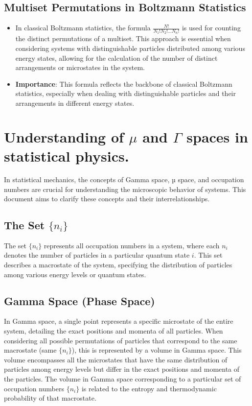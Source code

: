 \documentclass[12pt]{article}
\begin{document}
\subsection{Multiset Permutations in Boltzmann Statistics}
\begin{itemize}
    \item In classical Boltzmann statistics, the formula $\frac{N!}{N_1!N_2!\ldots N_n!}$ is used for counting the distinct permutations of a multiset. This approach is essential when considering systems with distinguishable particles distributed among various energy states, allowing for the calculation of the number of distinct arrangements or microstates in the system.
    \item \textbf{Importance}: This formula reflects the backbone of classical Boltzmann statistics, especially when dealing with distinguishable particles and their arrangements in different energy states.
\end{itemize}
\section{Understanding of $\mu$ and $\Gamma$ spaces in statistical physics.}
In statistical mechanics, the concepts of Gamma space, µ space, and occupation numbers are crucial for understanding the microscopic behavior of systems. This document aims to clarify these concepts and their interrelationships.

\subsection{The Set \(\{n_i\}\)}
The set \(\{n_i\}\) represents all occupation numbers in a system, where each \(n_i\) denotes the number of particles in a particular quantum state \(i\). This set describes a macrostate of the system, specifying the distribution of particles among various energy levels or quantum states.

\subsection{Gamma Space (Phase Space)}
In Gamma space, a single point represents a specific microstate of the entire system, detailing the exact positions and momenta of all particles. When considering all possible permutations of particles that correspond to the same macrostate (same \(\{n_i\}\)), this is represented by a volume in Gamma space. This volume encompasses all the microstates that have the same distribution of particles among energy levels but differ in the exact positions and momenta of the particles. The volume in Gamma space corresponding to a particular set of occupation numbers \(\{n_i\}\) is related to the entropy and thermodynamic probability of that macrostate.
\end{document}
